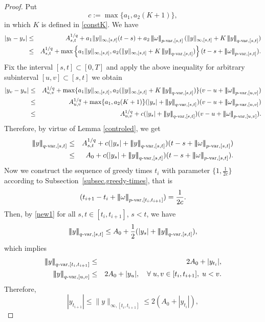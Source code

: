 \documentclass[10pt]{article}
\numberwithin{equation}{section} %
\newcommand{\ltn}{\ensuremath{\left| \! \left| \! \left|}}
\newcommand{\rtn}{\ensuremath{\right| \! \right| \! \right|}}
\begin{document}
\begin{proof}
Put 
$$
c:=\max\{a_1, a_2(K+1)\},
$$
in which $K$ is defined in \eqref{constK}.
We have
\begin{eqnarray*}
|y_t-y_s|&\leq & A_{s,t}^{1/q}+a_1\|y\|_{\infty,[s,t]}(t-s) + a_2\ltn \omega\rtn_{p\text{-var},[s,t]}(\|y\|_{\infty,[s,t]} + K\ltn y\rtn_{q\text{-var},[s,t]})\\
&\leq &A_{s,t}^{1/q}+\max \left\{a_1\|y\|_{\infty,[s,t]}, a_2(\|y\|_{\infty,[s,t]}+K\ltn y\rtn_{q\text{-var},[s,t]})\right\} (t-s+\ltn \omega\rtn_{p\text{-var},[s,t]}).
\end{eqnarray*}
Fix the interval $[s,t]\subset [0,T]$ and apply the above inequality for arbitrary subinterval $[u,v]\subset [s,t]$ we obtain
\begin{eqnarray*}
|y_v-y_u|&\leq & A_{u,v}^{1/q}+\max\{a_1\|y\|_{\infty,[s,t]}, a_2(\|y\|_{\infty,[s,t]}+K\ltn y\rtn_{q\text{-var},[s,t]})\} (v-u+\ltn \omega\rtn_{p\text{-var},[u,v]})\\
&\leq &A_{u,v}^{1/q}+\max\{a_1, a_2(K+1)\}(|y_s| +\ltn y\rtn_{q\text{-var},[s,t]}) (v-u+\ltn \omega\rtn_{p\text{-var},[u,v]})\\
&\leq &A_{u,v}^{1/q}+c(|y_s| +\ltn y\rtn_{q\text{-var},[s,t]}) (v-u+\ltn \omega\rtn_{p\text{-var},[u,v]}).
\end{eqnarray*}
 Therefore, by virtue of Lemma \ref{controled}, we get
\begin{eqnarray}
\ltn y\rtn_{q\text{-var},[s,t]}&\leq & A_{s,t}^{1/q}+ c(|y_s| +\ltn y\rtn_{q\text{-var},[s,t]}) (t-s+\ltn \omega\rtn_{p\text{-var},[s,t]})\notag\\
&\leq & A_0+ c(|y_s| +\ltn y\rtn_{q\text{-var},[s,t]}) (t-s+\ltn \omega\rtn_{p\text{-var},[s,t]}).\label{new1}
\end{eqnarray}
Now we construct  the sequence of greedy times $t_i$ with parameter $\{1, \frac{1}{2c}\}$ according to Subsection~\ref{subsec.greedy-times}, that is 
$$
(t_{i+1}-t_i+\ltn \omega\rtn_{p\text{-var},[t_i,t_{i+1}]})=\frac{1}{2c}.
$$
Then, by \eqref{new1} for all $s,t \in [t_i,t_{i+1}]$, $s<t$, we have
$$
\ltn y\rtn_{q\text{-var},[s,t]} \leq A_0 + \frac{1}{2}(|y_s| + \ltn y\rtn_{q\text{-var},[s,t]}),
$$
which implies
\begin{eqnarray*}
\ltn y\rtn_{q\text{-var},[t_i,t_{i+1}]}&\leq & 2A_0+ |y_{t_i}|,\\
\ltn y\rtn_{q\text{-var},[u,v]}&\leq & 2A_0+ |y_{u}|,\quad \forall \;  u,v \in [t_i,t_{i+1}],\; u<v.%
\end{eqnarray*}
Therefore,
$$
|y_{t_{i+1}}|\leq \|y\|_{\infty,[t_i,t_{i+1}]}\leq 2(A_0+|y_{t_i}|),
$$
\end{proof}
\end{document}
